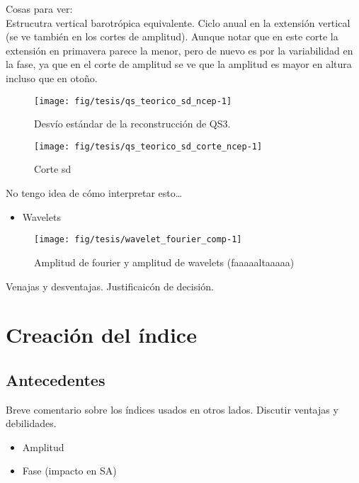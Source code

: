 \documentclass[spanish,a4paper]{book}
\providecommand{\tightlist}{%
  \setlength{\itemsep}{0pt}\setlength{\parskip}{0pt}}
\begin{document}
Cosas para ver:\\
Estrucutra vertical barotrópica equivalente. Ciclo anual en la extensión
vertical (se ve también en los cortes de amplitud). Aunque notar que en
este corte la extensión en primavera parece la menor, pero de nuevo es
por la variabilidad en la fase, ya que en el corte de amplitud se ve que
la amplitud es mayor en altura incluso que en otoño.

\begin{figure*}
\texttt{[image: fig/tesis/qs\_teorico\_sd\_ncep-1]} \caption{Desvío estándar de la reconstrucción de QS3.}\label{fig:qs_teorico_sd_ncep}
\end{figure*}

\begin{figure*}
\texttt{[image: fig/tesis/qs\_teorico\_sd\_corte\_ncep-1]} \caption{Corte sd}\label{fig:qs_teorico_sd_corte_ncep}
\end{figure*}

No tengo idea de cómo interpretar esto\ldots{}

\begin{itemize}
\tightlist
\item
  Wavelets
\end{itemize}

\begin{figure}

{\centering \texttt{[image: fig/tesis/wavelet\_fourier\_comp-1]} 

}

\caption{Amplitud de fourier y amplitud de wavelets (faaaaaltaaaaa)}\label{fig:wavelet_fourier_comp}
\end{figure}

Venajas y desventajas. Justificaicón de decisión.

\section{Creación del índice}\label{creacion-del-indice}

\subsection{Antecedentes}\label{antecedentes}

Breve comentario sobre los índices usados en otros lados. Discutir
ventajas y debilidades.

\begin{itemize}
\tightlist
\item
  Amplitud
\item
  Fase (impacto en SA)
\end{itemize}
\end{document}
